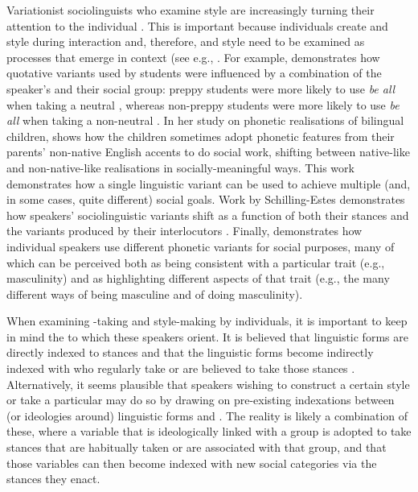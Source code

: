 \noindent Variationist sociolinguists who examine style are increasingly turning their attention to the individual \citep{eckert1996,eckert2011,podesva2011}.  This is important because individuals create  and style during interaction and, therefore,  and style need to be examined as processes that emerge in context (see e.g., \citet{coupland2007,kiesling2009,rampton2013}. For example, \citet[110--115]{bucholtz2010} demonstrates how quotative variants used by  students were influenced by a combination of the speaker's  and their social group: preppy students were more likely to use \textit{be all} when taking a neutral , whereas non-preppy students were more likely to use \textit{be all} when taking a non-neutral .  In her study on phonetic realisations of bilingual children, \citet{khattab2013} shows how the children sometimes adopt phonetic features from their parents' non-native English accents to do social work, shifting between native-like and non-native-like realisations in socially-meaningful ways.  This work demonstrates how a single linguistic variant can be used to achieve multiple (and, in some cases, quite different) social goals. Work by Schilling-Estes demonstrates how speakers' sociolinguistic variants shift as a function of both their stances and the variants produced by their interlocutors \citep{schillingestes2004}. Finally, \citet{kirtley-diss} demonstrates how individual speakers use different phonetic variants for social purposes, many of which can be perceived both as being consistent with a particular trait (e.g., masculinity) and as highlighting different aspects of that trait (e.g., the many different ways of being masculine and of doing masculinity).  

When examining -taking and style-making by individuals, it is important to keep in mind the  to which these speakers orient.  It is believed that linguistic forms are directly indexed to stances and that the linguistic forms become indirectly indexed with  who regularly take or are believed to take those stances \citep{bucholtz2009,dubois2007}. Alternatively, it seems plausible that speakers wishing to construct a certain style or take a particular  may do so by drawing on pre-existing indexations between (or ideologies around) linguistic forms and .  The reality is likely a combination of these, where a variable that is ideologically linked with a group is adopted to take stances that are habitually taken or are associated with that group, and that those variables can then become indexed with new social categories via the stances they enact.

